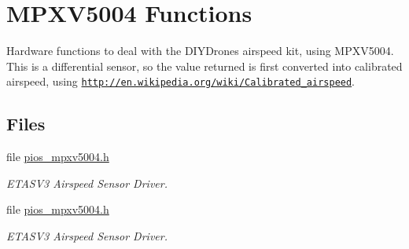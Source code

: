 \hypertarget{group___p_i_o_s___m_p_x_v5004}{\section{M\-P\-X\-V5004 Functions}
\label{group___p_i_o_s___m_p_x_v5004}
}


Hardware functions to deal with the D\-I\-Y\-Drones airspeed kit, using M\-P\-X\-V5004. This is a differential sensor, so the value returned is first converted into calibrated airspeed, using \href{http://en.wikipedia.org/wiki/Calibrated_airspeed}{\tt http\-://en.\-wikipedia.\-org/wiki/\-Calibrated\-\_\-airspeed}.  


\subsection*{Files}
\begin{DoxyCompactItemize}
\item 
file \hyperlink{pios__mpxv5004_8h}{pios\-\_\-mpxv5004.\-h}
\begin{DoxyCompactList}\small\item\em E\-T\-A\-S\-V3 Airspeed Sensor Driver. \end{DoxyCompactList}\item 
file \hyperlink{pios__mpxv5004_8h}{pios\-\_\-mpxv5004.\-h}
\begin{DoxyCompactList}\small\item\em E\-T\-A\-S\-V3 Airspeed Sensor Driver. \end{DoxyCompactList}\end{DoxyCompactItemize}
